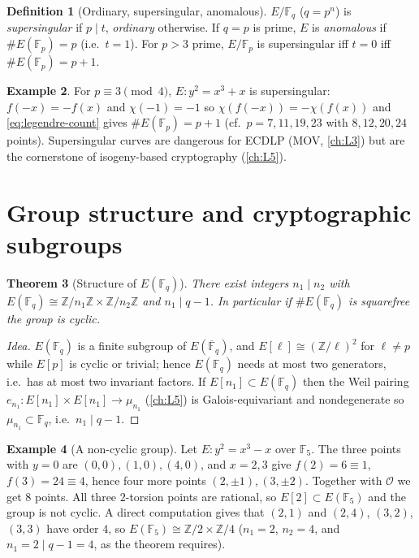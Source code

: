 \documentclass[11pt,a4paper,oneside]{book}
\theoremstyle{plain}
\newtheorem{theorem}{Theorem}[chapter]
\theoremstyle{definition}
\newtheorem{definition}[theorem]{Definition}
\newtheorem{example}[theorem]{Example}
\theoremstyle{remark}
\newcommand{\Z}{\mathbb{Z}}
\newcommand{\F}{\mathbb{F}}
\newcommand{\Fp}{\mathbb{F}_p}
\newcommand{\Fq}{\mathbb{F}_q}
\newcommand{\Fqbar}{\overline{\mathbb{F}}_q}
\newcommand{\Oinf}{\mathcal{O}}
\begin{document}
\begin{definition}[Ordinary, supersingular, anomalous]
$E/\Fq$ ($q=p^n$) is \emph{supersingular} if $p\mid t$, \emph{ordinary} otherwise. If $q=p$ is prime, $E$ is \emph{anomalous} if $\#E(\Fp)=p$ (i.e.\ $t=1$).
For $p>3$ prime, $E/\Fp$ is supersingular iff $t=0$ iff $\#E(\Fp)=p+1$.
\end{definition}

\begin{example}
For $p\equiv3\pmod4$, $E:y^2=x^3+x$ is supersingular: $f(-x)=-f(x)$ and $\chi(-1)=-1$ so $\chi(f(-x))=-\chi(f(x))$ and \eqref{eq:legendre-count} gives $\#E(\Fp)=p+1$ (cf.\ $p=7,11,19,23$ with $8,12,20,24$ points). Supersingular curves are dangerous for ECDLP (MOV, \cref{ch:L3}) but are the cornerstone of isogeny-based cryptography (\cref{ch:L5}).
\end{example}

\section{Group structure and cryptographic subgroups}

\begin{theorem}[Structure of $E(\Fq)$]\label{thm:structure}
There exist integers $n_1\mid n_2$ with $E(\Fq)\cong\Z/n_1\Z\times\Z/n_2\Z$ and $n_1\mid q-1$. In particular if $\#E(\Fq)$ is squarefree the group is cyclic.
\end{theorem}
\begin{proof}[Idea]
$E(\Fq)$ is a finite subgroup of $E(\Fqbar)$, and $E[\ell]\cong(\Z/\ell)^2$ for $\ell\ne p$ while $E[p]$ is cyclic or trivial; hence $E(\Fq)$ needs at most two generators, i.e.\ has at most two invariant factors. If $E[n_1]\subset E(\Fq)$ then the Weil pairing $e_{n_1}:E[n_1]\times E[n_1]\to\mu_{n_1}$ (\cref{ch:L5}) is Galois-equivariant and nondegenerate so $\mu_{n_1}\subset\Fq$, i.e.\ $n_1\mid q-1$.
\end{proof}

\begin{example}[A non-cyclic group]
Let $E:y^2=x^3-x$ over $\F_5$. The three points with $y=0$ are $(0,0),(1,0),(4,0)$, and $x=2,3$ give $f(2)=6\equiv1$, $f(3)=24\equiv4$, hence four more points $(2,\pm1),(3,\pm2)$. Together with $\Oinf$ we get $8$ points. All three $2$-torsion points are rational, so $E[2]\subset E(\F_5)$ and the group is not cyclic. A direct computation gives that $(2,1)$ and $(2,4)$, $(3,2)$, $(3,3)$ have order $4$, so
$E(\F_5)\cong\Z/2\times\Z/4$ ($n_1=2$, $n_2=4$, and $n_1=2\mid q-1=4$, as the theorem requires).
\end{example}
\end{document}
